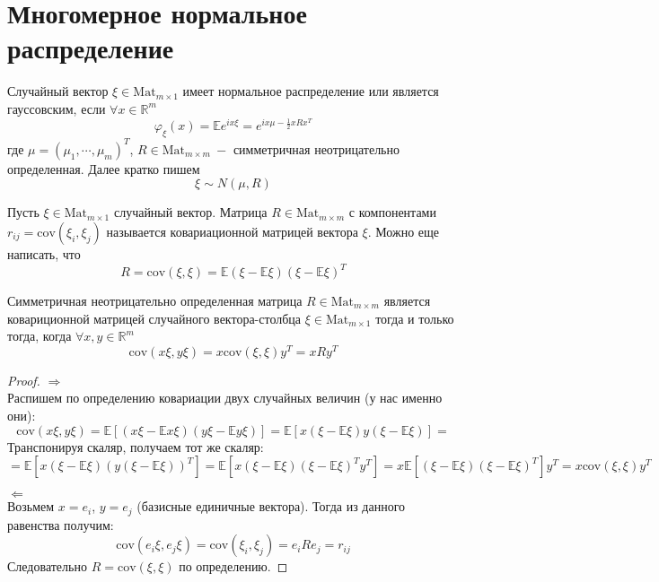 \clearpage

\section{Многомерное нормальное распределение}  

\begin{definition} Случайный вектор $\xi \in \text{Mat}_{m \times 1}$ имеет $\textit{нормальное распределение}$ или является $\textit{гауссовским}$, если $\forall x \in \mathbb{R} ^ m$
\[
    \varphi_{\xi}\left(x\right) = \mathbb{E}  e ^ {i  x \xi} = e ^ {i x\mu - \frac12 x R x ^ T}
\]
где $\mu = \left(\mu_1, \cdots , \mu_m\right)^T$, $R \in \text{Mat}_{m \times m}\ - $ симметричная неотрицательно определенная. Далее кратко пишем
\[
    \xi \sim N\left(\mu, R\right)
\]
\end{definition}

\begin{definition}
Пусть $\xi \in \text{Mat}_{m \times 1}$ случайный вектор. Матрица $R \in \text{Mat}_{m \times m}$ с компонентами $r_{ij} = \text{cov} \left(\xi_i, \xi_j\right)$
называется $\textit{ковариационной матрицей}$ вектора $\xi$. Можно еще написать, что 
\[
    R = \text{cov} \left(\xi, \xi\right) = \mathbb{E} \left(\xi - \mathbb{E} \xi\right) \left(\xi - \mathbb{E} \xi\right)^T
\]
\end{definition}
\begin{lemma}
Симметричная неотрицательно определенная матрица $R \in \text{Mat}_{m \times m}$ является ковариционной матрицей случайного вектора-столбца $\xi \in \text{Mat}_{m \times 1}$ тогда и только тогда, когда $\forall x, y \in \mathbb{R} ^ m$
\[
    \text{cov} \left(x\xi, y \xi\right) = x \text{cov} \left(\xi, \xi\right) y ^ T = x R y ^ T
\]
\end{lemma}

\begin{proof}
$\Rightarrow$ \\
Распишем по определению ковариации двух случайных величин (у нас именно они):
\[
    \text{cov} \left(x\xi, y \xi\right) = \mathbb{E} \left[\left(x \xi - \mathbb{E} x \xi\right) \left(y \xi - \mathbb{E} y \xi \right)\right] = \mathbb{E} \left[x \left(\xi - \mathbb{E} \xi\right) y \left(\xi - \mathbb{E} \xi\right)\right]
     = 
\]
Транспонируя скаляр, получаем тот же скаляр:
\[
    = \mathbb{E} \left[x \left(\xi - \mathbb{E} \xi\right) \left(y \left(\xi - \mathbb{E} \xi\right)\right) ^ T\right] 
    = \mathbb{E} \left[x \left(\xi - \mathbb{E} \xi\right)\left(\xi - \mathbb{E} \xi\right) ^ T y ^ T\right] 
    = x \mathbb{E} \left[\left(\xi - \mathbb{E} \xi\right)\left(\xi - \mathbb{E} \xi\right) ^ T\right] y ^ T
    = x \text{cov} \left(\xi, \xi\right) y ^ T
\]

$\Leftarrow$ \\
Возьмем $x = e_i$, $y = e_j$ (базисные единичные вектора). Тогда из данного равенства получим:
\[
    \text{cov} \left(e_i \xi, e_j \xi\right) = \text{cov} \left(\xi_i, \xi_j\right) = e_i R e_j = r_{ij}
\]
Следовательно $R = \text{cov} \left(\xi, \xi\right)$ по определению.

\end{proof}

